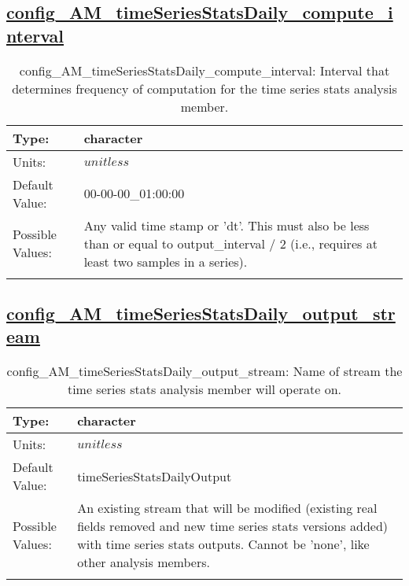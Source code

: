 \subsection[config\_AM\_timeSeriesStatsDaily\_compute\_interval]{\hyperref[sec:nm_tab_AM_timeSeriesStatsDaily]{config\_AM\_timeSeriesStatsDaily\_compute\_interval}}
\label{subsec:nm_sec_config_AM_timeSeriesStatsDaily_compute_interval}
\begin{center}
\begin{longtable}{| p{2.0in} || p{4.0in} |}
    \hline
    Type: & character \\
    \hline
    Units: & $unitless$ \\
    \hline
    Default Value: & 00-00-00\_01:00:00 \\
    \hline
    Possible Values: & Any valid time stamp or 'dt'. This must also be less than or equal to output\_interval / 2 (i.e., requires at least two samples in a series). \\
    \hline
    \caption{config\_AM\_timeSeriesStatsDaily\_compute\_interval: Interval that determines frequency of computation for the time series stats analysis member.}
\end{longtable}
\end{center}
\subsection[config\_AM\_timeSeriesStatsDaily\_output\_stream]{\hyperref[sec:nm_tab_AM_timeSeriesStatsDaily]{config\_AM\_timeSeriesStatsDaily\_output\_stream}}
\label{subsec:nm_sec_config_AM_timeSeriesStatsDaily_output_stream}
\begin{center}
\begin{longtable}{| p{2.0in} || p{4.0in} |}
    \hline
    Type: & character \\
    \hline
    Units: & $unitless$ \\
    \hline
    Default Value: & timeSeriesStatsDailyOutput \\
    \hline
    Possible Values: & An existing stream that will be modified (existing real fields removed and new time series stats versions added) with time series stats outputs. Cannot be 'none', like other analysis members. \\
    \hline
    \caption{config\_AM\_timeSeriesStatsDaily\_output\_stream: Name of stream the time series stats analysis member will operate on.}
\end{longtable}
\end{center}
